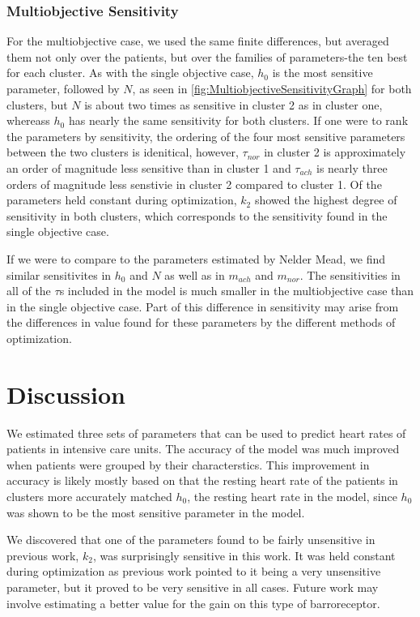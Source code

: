 \documentclass[fleqn,10pt]{wlscirep}
\begin{document}
\subsubsection*{Multiobjective Sensitivity} 
For the multiobjective case, we used the same finite differences, but averaged them not only over the patients, but over the families of parameters-the ten best for each cluster. As with the single objective case, $h_0$ is the most sensitive parameter, followed by $N$, as seen in \ref{fig:MultiobjectiveSensitivityGraph} for both clusters, but $N$ is about two times as sensitive in cluster 2 as in cluster one, whereass $h_0$ has nearly the same sensitivity for both clusters. If one were to rank the parameters by sensitivity, the ordering of the four most sensitive parameters between the two clusters is idenitical, however, $\tau_{nor}$ in cluster 2 is approximately an order of magnitude less sensitive than in cluster 1 and $\tau_{ach}$ is nearly three orders of magnitude less senstivie in cluster 2 compared to cluster 1. Of the parameters held constant during optimization, $k_2$ showed the highest degree of sensitivity in both clusters, which corresponds to the sensitivity found in the single objective case.

If we were to compare to the parameters estimated by Nelder Mead, we find similar sensitivites in $h_0$ and $N$ as well as in $m_{ach}$ and $m_{nor}$. The sensitivities in all of the $\tau$s included in the model is much smaller in the multiobjective case than in the single objective case. Part of this difference in sensitivity may arise from the differences in value found for these parameters by the different methods of optimization.
\section*{Discussion}
We estimated three sets of parameters that can be used to predict heart rates of patients in intensive care units. The accuracy of the model was much improved when patients were grouped by their characterstics. This improvement in accuracy is likely mostly based on that the resting heart rate of the patients in clusters more accurately matched $h_0$, the resting heart rate in the model, since $h_0$ was shown to be the most sensitive parameter in the model. 

We discovered that one of the parameters found to be fairly unsensitive in previous work, $k_2$, was surprisingly sensitive in this work. It was held constant during optimization as previous work pointed to it being a very unsensitive parameter, but it proved to be very sensitive in all cases. Future work may involve estimating a better value for the gain on this type of barroreceptor. 
\end{document}
